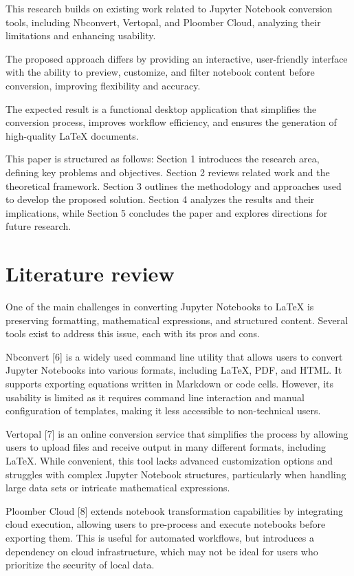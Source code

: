 \documentclass{article}
\begin{document}
\begin{multicols}{2}
This research builds on existing work related to Jupyter Notebook conversion tools, including Nbconvert, Vertopal, and Ploomber Cloud, analyzing their limitations and enhancing usability.

The proposed approach differs by providing an interactive, user-friendly interface with the ability to preview, customize, and filter notebook content before conversion, improving flexibility and accuracy.

The expected result is a functional desktop application that simplifies the conversion process, improves workflow efficiency, and ensures the generation of high-quality LaTeX documents.

This paper is structured as follows: Section 1 introduces the research area, defining key problems and objectives. Section 2 reviews related work and the theoretical framework. Section 3 outlines the methodology and approaches used to develop the proposed solution. Section 4 analyzes the results and their implications, while Section 5 concludes the paper and explores directions for future research.

\section{Literature review}
One of the main challenges in converting Jupyter Notebooks to LaTeX is preserving formatting, mathematical expressions, and structured content. Several tools exist to address this issue, each with its pros and cons.

Nbconvert [6] is a widely used command line utility that allows users to convert Jupyter Notebooks into various formats, including LaTeX, PDF, and HTML. It supports exporting equations written in Markdown or code cells. However, its usability is limited as it requires command line interaction and manual configuration of templates, making it less accessible to non-technical users.

Vertopal [7] is an online conversion service that simplifies the process by allowing users to upload files and receive output in many different formats, including LaTeX. While convenient, this tool lacks advanced customization options and struggles with complex Jupyter Notebook structures, particularly when handling large data sets or intricate mathematical expressions.

Ploomber Cloud [8] extends notebook transformation capabilities by integrating cloud execution, allowing users to pre-process and execute notebooks before exporting them. This is useful for automated workflows, but introduces a dependency on cloud infrastructure, which may not be ideal for users who prioritize the security of local data.


\end{multicols}
\end{document}

